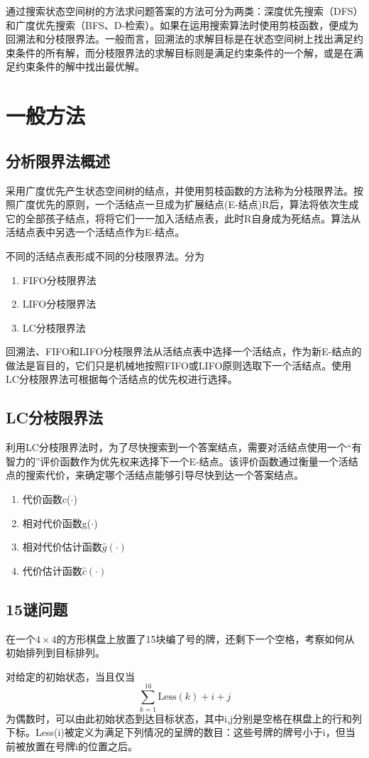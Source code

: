 通过搜索状态空间树的方法求问题答案的方法可分为两类：深度优先搜索（DFS）和广度优先搜索（BFS、D-检索）。如果在运用搜索算法时使用剪枝函数，便成为回溯法和分枝限界法。一般而言，回溯法的求解目标是在状态空间树上找出满足约束条件的所有解，而分枝限界法的求解目标则是满足约束条件的一个解，或是在满足约束条件的解中找出最优解。

\section{一般方法}
\subsection*{分析限界法概述}
采用广度优先产生状态空间树的结点，并使用剪枝函数的方法称为分枝限界法。按照广度优先的原则，一个活结点一旦成为扩展结点(E-结点)R后，算法将依次生成它的全部孩子结点，将将它们一一加入活结点表，此时R自身成为死结点。算法从活结点表中另选一个活结点作为E-结点。

不同的活结点表形成不同的分枝限界法。分为
\begin{enumerate}
	\item FIFO分枝限界法
	\item LIFO分枝限界法
	\item LC分枝限界法
\end{enumerate}
回溯法、FIFO和LIFO分枝限界法从活结点表中选择一个活结点，作为新E-结点的做法是盲目的，它们只是机械地按照FIFO或LIFO原则选取下一个活结点。使用LC分枝限界法可根据每个活结点的优先权进行选择。

\subsection*{LC分枝限界法}
利用LC分枝限界法时，为了尽快搜索到一个答案结点，需要对活结点使用一个“有智力的”评价函数作为优先权来选择下一个E-结点。该评价函数通过衡量一个活结点的搜索代价，来确定哪个活结点能够引导尽快到达一个答案结点。
\begin{enumerate}
	\item 代价函数c($\cdot$)
	\item 相对代价函数g($\cdot$)
	\item 相对代价估计函数$\hat{g}(\cdot)$
	\item 代价估计函数$\hat{c}(\cdot)$
\end{enumerate}
\subsection*{15谜问题}
在一个$4\times 4$的方形棋盘上放置了15块编了号的牌，还剩下一个空格，考察如何从初始排列到目标排列。
\begin{theorem}{}{}
	对给定的初始状态，当且仅当$$\sum_{k=1}^{16}\mathrm{Less}(k)+i+j$$为偶数时，可以由此初始状态到达目标状态，其中i,j分别是空格在棋盘上的行和列下标。Less(i)被定义为满足下列情况的呈牌的数目：这些号牌的牌号小于i，但当前被放置在号牌i的位置之后。
\end{theorem}
